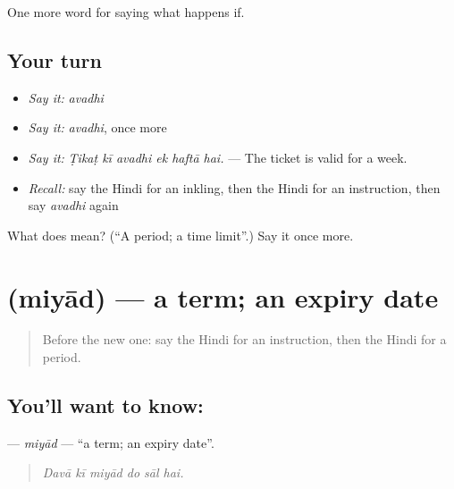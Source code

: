 \begin{grammarlens}[title={What you've built}]
One more word for saying what happens if.
\end{grammarlens}

\subsection*{Your turn}
\begin{itemize}
\raggedright
  \item \emph{Say it:} \emph{avadhi}
  \item \emph{Say it:} \emph{avadhi}, once more
  \item \emph{Say it:} \emph{Ṭikaṭ kī avadhi ek haftā hai.} — The ticket is valid for a week.
  \item \emph{Recall:} say the Hindi for an inkling, then the Hindi for an instruction, then say \emph{avadhi} again
\end{itemize}

\begin{tcolorbox}[breakable,colback=teal!4,colframe=teal!35!black,title={Before you move on}]
What does  mean? (\textquotedblleft{}A period; a time limit\textquotedblright{}.) Say it once more.
\end{tcolorbox}
\section[\texorpdfstring{\hi{मियाद} (miyād)}{मियाद (miyād)}]{ (miyād) — a term; an expiry date}

\label{lesson:HI-C548-miyad}



\begin{quote}
Before the new one: say the Hindi for an instruction, then the Hindi for a period.
\end{quote}

\subsection*{You'll want to know: }
\textbf{} — \emph{miyād} — \textquotedblleft{}a term; an expiry date\textquotedblright{}.

\begin{quote}
     
\end{quote}

\begin{quote}
\emph{Davā kī miyād do sāl hai.}
\end{quote}

